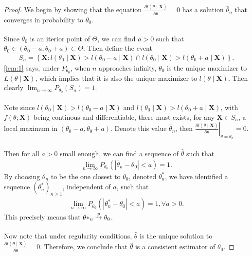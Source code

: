 \begin{proof}
We begin by showing that the equation $\frac{\partial l(\theta\mid \bm{X})}{\partial\theta}=0$ has a solution $\bar{\theta}_n$ that converges in probability to $\theta_0$.\\\\
Since $\theta_0$ is an iterior point of $\Theta$, we can find $a>0$ such that $\theta_0 \in (\theta_0-a, \theta_0+a) \subset \Theta$. Then define the event
\begin{align*}
S_n = \left\{ \bm{X}: l(\theta_0 \mid \bm{X}) > l(\theta_0 - a \mid \bm{X}) \cap l(\theta_0 \mid \bm{X}) > l(\theta_0 + a \mid \bm{X}) \right\}.
\end{align*}
\cref{lem:1} says, under $P_{\theta_0}$, when $n$ approaches infinity, $\theta_0$ is the unique maximizer to $L(\theta\mid \bm{X})$, which implies that it is also the unique maximizer to $l(\theta\mid \bm{X})$. Then clearly $\lim_{n\to\infty}P_{\theta_0}(S_n) = 1$.\\\\
Note since $l(\theta_0\mid \bm{X}) > l(\theta_0-a\mid \bm{X})$ and $l(\theta_0\mid \bm{X}) > l(\theta_0+a\mid \bm{X})$, with $f(\theta; \bm{X})$ being continous and differentiable, there must exists, for any $\bm{X}\in S_n$, a local maximum in $(\theta_0-a, \theta_0+a)$. Denote this value $\bar{\theta}_n$, then $\left.\frac{\partial l(\theta\mid \bm{X})}{\partial\theta}\right\vert_{\theta=\bar{\theta}_n}=0$.\\\\
Then for all $a>0$ small enough, we can find a sequence of $\hat{\theta}$ such that
\begin{align*}
\lim_{n\to\infty}P_{\theta_0}\left( |\bar{\theta}_n - \theta_0| < a \right) = 1.
\end{align*}
By choosing $\bar{\theta}_n$ to be the one closest to $\theta_0$, denoted $\theta^*_n$, we have identified a sequence $\left(\theta^*_n\right)_{n\geq1}$, independent of $a$, such that
\begin{align*}
\lim_{n\to\infty}P_{\theta_0}\left( |\theta^*_n - \theta_0| < a \right) = 1, \forall a > 0.
\end{align*}
This precisely means that $\theta*_n \overset{p}{\rightarrow} \theta_0$.\\\\
Now note that under regularity conditions, $\hat{\theta}$ is the unique solution to $\frac{\partial l(\theta\mid \bm{X})}{\partial\theta}=0$. Therefore, we conclude that $\hat{\theta}$ is a consistent estimator of $\theta_0$.
\end{proof}

